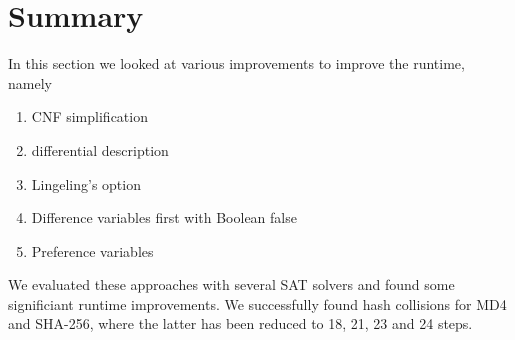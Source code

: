 \section{Summary}
\label{sec:results-summary}
%
In this section we looked at various improvements to improve the runtime, namely
\begin{enumerate}
  \item CNF simplification
  \item differential description
  \item Lingeling's \mone{} option
  \item Difference variables first with Boolean false
  \item Preference variables
\end{enumerate}
%
We evaluated these approaches with several SAT solvers and found some significiant
runtime improvements. We successfully found hash collisions for MD4 and SHA-256,
where the latter has been reduced to 18, 21, 23 and 24 steps.
